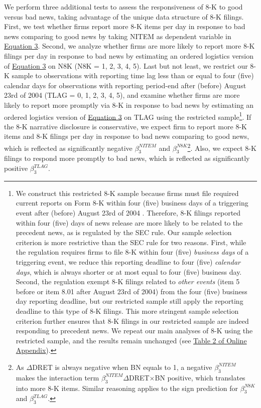 \documentclass[a4paper]{article}
\begin{document}
\begin{spacing}{2}
We perform three additional tests to assess the responsiveness of 8-K to good versus bad news, taking advantage of the unique data structure of 8-K filings. First, we test whether firms report more 8-K items per day in response to bad news comparing to good news by taking NITEM as dependent variable in \hyperref[eq3]{Equation 3}. Second, we analyze whether firms are more likely to report more 8-K filings per day in response to bad news by estimating an ordered logistics version of \hyperref[eq3]{Equation 3} on N8K (N8K = 1, 2, 3, 4, 5). Last but not least, we restrict our 8-K sample to observations with reporting time lag less than or equal to four (five) calendar days for observations with reporting period-end after (before) August 23rd of 2004 (TLAG = 0, 1, 2, 3, 4, 5), and examine whether firms are more likely to report more promptly via 8-K in response to bad news by estimating an ordered logistics version of \hyperref[eq3]{Equation 3} on TLAG using the restricted sample\footnote{We construct this restricted 8-K sample because firms must file required current reports on Form 8-K within four (five) business days of a triggering event after (before) August 23rd of 2004 \citep*{secFinalRuleAdditional2004}. Therefore, 8-K filings reported within four (five) days of news release are more likely to be related to the precedent news, as is regulated by the SEC rule. Our sample selection criterion is more restrictive than the SEC rule for two reasons. First, while the regulation requires firms to file 8-K within four (five) \textit{business days} of a triggering event, we reduce this reporting deadline to four (five) \textit{calendar days}, which is always shorter or at most equal to four (five) business day. Second, the regulation exempt 8-K filings related to \textit{other events} (item 5 before or item 8.01 after August 23rd of 2004) from the four (five) business day reporting deadline, but our restricted sample still apply the reporting deadline to this type of 8-K filings. This more stringent sample selection criterion further ensures that 8-K filings in our restricted sample are indeed responding to precedent news. We repeat our main analyses of 8-K using the restricted sample, and the results remain unchanged (see \hyperref[oat2]{Table 2 of Online Appendix}). }. If the 8-K narrative disclosure is conservative, we expect firm to report more 8-K items and 8-K filings per day in response to bad news comparing to good news, which is reflected as significantly negative $\beta_3^{NITEM}$ and $\beta_3^{N8K}$\footnote{As $\Delta$DRET is always negative when BN equals to 1, a negative $\beta_3^{NITEM}$ makes the interaction term $\beta_3^{NITEM}$$\Delta$DRET$\times$BN positive, which translates into more 8-K items. Similar reasoning applies to the sign prediction for $\beta_3^{N8K}$ and $\beta_3^{TLAG}$.}. Also, we expect 8-K filings to respond more promptly to bad news, which is reflected as significantly positive $\beta_3^{TLAG}$.


\end{spacing}
\end{document}
